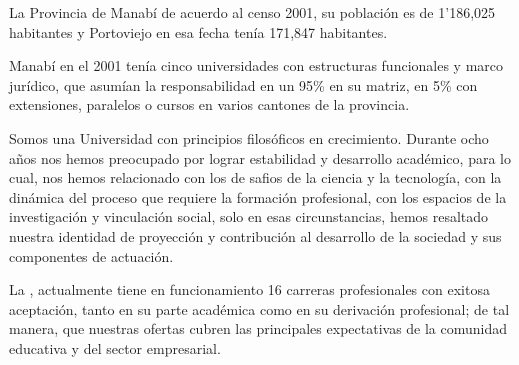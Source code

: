 La Provincia de Manabí de acuerdo al censo 2001, su población es de 1'186,025
habitantes y Portoviejo en esa fecha tenía 171,847 habitantes.

Manabí en el 2001 tenía cinco universidades con estructuras funcionales y 
marco jurídico, que asumían la responsabilidad en un 95\% en su matriz, en 
5\% con extensiones, paralelos o cursos en varios cantones de la provincia.

Somos una Universidad con principios  filosóficos  en crecimiento. 
Durante ocho años nos hemos preocupado por lograr estabilidad y desarrollo 
académico, para lo cual, nos hemos  relacionado con los de safios de la 
ciencia y la tecnología, con la dinámica del proceso que requiere la 
formación profesional, con los espacios de la investigación y vinculación social, 
solo en esas circunstancias, hemos resaltado nuestra identidad de proyección y 
contribución al desarrollo de la sociedad y sus componentes de actuación.

La \University, actualmente tiene en funcionamiento 16 carreras 
profesionales con exitosa aceptación, tanto en su  parte académica como en su 
derivación profesional;  de tal manera, que nuestras ofertas  cubren las 
principales expectativas de la comunidad educativa y del sector empresarial.


